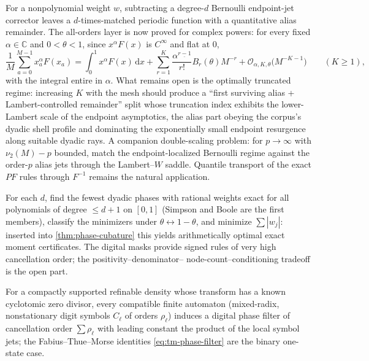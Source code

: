 \documentclass[11pt,oneside]{article}
\numberwithin{equation}{section}
\theoremstyle{definition}
\theoremstyle{remark}
\newcommand{\C}{\mathbb C}
\newcommand{\dd}{\,\mathrm d}
\newcommand{\bigO}{\mathcal O}
\newcommand{\vtwo}{\nu_2}
\newcommand{\fall}[2]{#1^{\underline{#2}}}
\newcommand{\abs}[1]{\left\lvert #1\right\rvert}
\begin{document}
\begin{question}
\label{q:analytic-weights}
For a nonpolynomial weight $w$, subtracting a degree-$d$ Bernoulli
endpoint-jet corrector leaves a $d$-times-matched periodic function
with a quantitative alias remainder.  The all-orders layer is now
proved for complex powers: for every fixed $\alpha\in\C$ and
$0<\theta<1$, since $x^{\alpha}F(x)$ is $C^\infty$ and flat at $0$,
\begin{equation}
 \frac1M\sum_{a=0}^{M-1}x_a^{\alpha}F(x_a)
 =\int_0^1x^{\alpha}F(x)\dd x
 +\sum_{r=1}^{K}\frac{\fall\alpha{r-1}}{r!}B_r(\theta)M^{-r}
 +\bigO_{\alpha,K,\theta}\bigl(M^{-K-1}\bigr)
 \qquad(K\ge1),
 \label{eq:complex-alpha-EM}
\end{equation}
with the integral entire in $\alpha$.  What remains open is the
optimally truncated regime: increasing $K$ with the mesh should
produce a ``first surviving alias + Lambert-controlled remainder''
split whose truncation index exhibits the lower-Lambert scale of the
endpoint asymptotics, the alias part obeying the corpus's dyadic
shell profile and dominating the exponentially small endpoint
resurgence along suitable dyadic rays.  A companion double-scaling
problem: for $p\to\infty$ with $\vtwo(M)-p$ bounded, match the
endpoint-localized Bernoulli regime against the order-$p$ alias jets
through the Lambert--$W$ saddle.  Quantile transport of the exact
$PF$ rules through $F^{-1}$ remains the natural application.
\end{question}

\begin{question}
\label{q:dyadic-phase-support}
For each $d$, find the fewest dyadic phases with rational weights
exact for all polynomials of degree $\le d+1$ on $[0,1]$ (Simpson and
Boole are the first members), classify the minimizers under
$\theta\leftrightarrow1-\theta$, and minimize $\sum\abs{w_j}$:
inserted into \cref{thm:phase-cubature} this yields arithmetically
optimal exact moment certificates.  The digital masks provide signed
rules of very high cancellation order; the positivity--denominator--%
node-count--conditioning tradeoff is the open part.
\end{question}

\begin{conjecture}
\label{conj:automatic-dictionary}
For a compactly supported refinable density whose transform has a
known cyclotomic zero divisor, every compatible finite automaton
(mixed-radix, nonstationary digit symbols $C_\ell$ of orders
$\rho_\ell$) induces a digital phase filter of cancellation order
$\sum\rho_\ell$ with leading constant the product of the local
symbol jets; the Fabius--Thue--Morse identities
\eqref{eq:tm-phase-filter} are the binary one-state case.
\end{conjecture}
\end{document}
